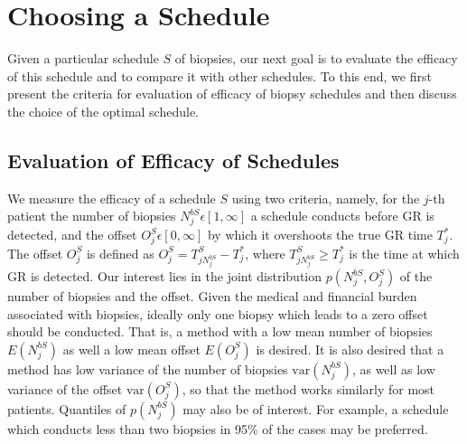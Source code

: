 
\section{Choosing a Schedule}
\label{sec : choosing_schedule}
Given a particular schedule $S$ of biopsies, our next goal is to evaluate the efficacy of this schedule and to compare it with other schedules. To this end, we first present the criteria for evaluation of efficacy of biopsy schedules and then discuss the choice of the optimal schedule.

\subsection{Evaluation of Efficacy of Schedules}
We measure the efficacy of a schedule $S$ using two criteria, namely, for the $j$-th patient the number of biopsies $N^{bS}_j \epsilon [1, \infty]$ a schedule conducts before GR is detected, and the offset $O^S_j \epsilon [0, \infty]$ by which it overshoots the true GR time $T^*_j$. The offset $O^S_j$ is defined as $O^S_j = T^S_{j{N^{bS}_j}} - T^*_j$, where $T^S_{j{N^{bS}_j}} \geq T^*_j$ is the time at which GR is detected. Our interest lies in the joint distribution $p(N^{bS}_j, O^S_j)$ of the number of biopsies and the offset. Given the medical and financial burden associated with biopsies, ideally only one biopsy which leads to a zero offset should be conducted. That is, a method with a low mean number of biopsies $E(N^{bS}_j)$ as well a low mean offset $E(O^S_j)$ is desired. It is also desired that a method has low variance of the number of biopsies $\mbox{var}(N^{bS}_j)$, as well as low variance of the offset $\mbox{var}(O^S_j)$, so that the method works similarly for most patients. Quantiles of $p(N^{bS}_j)$ may also be of interest. For example, a schedule which conducts less than two biopsies in 95\% of the cases may be preferred.

